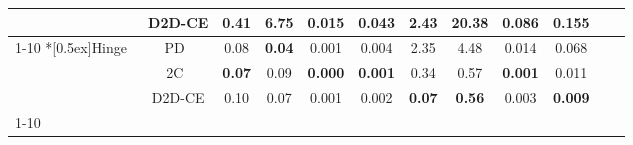 \documentclass{article}
\begin{document}
\begin{table}[ht]
{\begin{tabular}{lccccccccccc}
 & \cellcolor{yellow!20}D2D-CE & \cellcolor{yellow!20}0.41 & \cellcolor{yellow!20}6.75 & \cellcolor{yellow!20}0.015 & \cellcolor{yellow!20}0.043 & \cellcolor{yellow!20}2.43 & \cellcolor{yellow!20}\textbf{20.38} & \cellcolor{yellow!20}\textbf{0.086} & \cellcolor{yellow!20}\textbf{0.155} \\
\cmidrule[0.4pt]{1-10}
\multirow{3}*[0.5ex]{Hinge~\cite{Lim2017GeometricG}} & PD~\cite{Miyato2018cGANsWP} & 0.08 & \textbf{0.04} & 0.001 & 0.004 & 2.35 & 4.48 & 0.014 & 0.068\\
& 2C~\cite{kang2020contragan} & \textbf{0.07} & 0.09 & \textbf{0.000} & \textbf{0.001} & 0.34 & 0.57 & \textbf{0.001} & 0.011\\
& \cellcolor{yellow!20}D2D-CE & \cellcolor{yellow!20}0.10 & \cellcolor{yellow!20}0.07 & \cellcolor{yellow!20}0.001 & \cellcolor{yellow!20}0.002 & \cellcolor{yellow!20}\textbf{0.07} & \cellcolor{yellow!20}\textbf{0.56} & \cellcolor{yellow!20}0.003 & \cellcolor{yellow!20}\textbf{0.009}\\
\cmidrule[1.0pt]{1-10}
\end{tabular}}
\end{table}
 \clearpage
\end{document}
